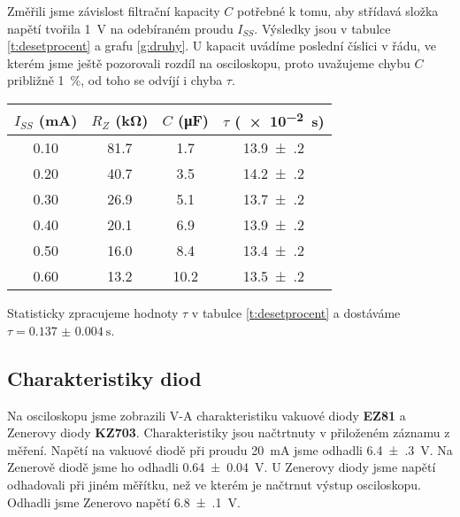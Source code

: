 Změřili jsme závislost filtrační kapacity $C$ potřebné k tomu, aby střídavá složka napětí tvořila \SI{1}{\volt} na odebíraném proudu $I_{SS}$.
Výsledky jsou v tabulce \ref{t:desetprocent} a grafu \ref{g:druhy}.
U kapacit uvádíme poslední číslici v řádu, ve kterém jsme ještě pozorovali rozdíl na osciloskopu, proto uvažujeme chybu $C$ približně \SI{1}{\percent}, od toho se odvíjí i chyba $\tau$.

\begin{graph}[htbp] 
\centering

\caption{Závislost filtrační kapacity $C$ potřebné k tomu, aby střídavá složka napětí tvořila \SI{1}{\volt} špičkové hodnoty, na odebíraném proudu $I_{SS}$}
\label{g:druhy}
\end{graph}

\begin{tabulka}[htbp]
\centering
\begin{tabular}{c|c|c|c}
$I_{SS}$ (\si{\milli\ampere}) & $R_Z$ (\si{\kilo\ohm}) & $C$ (\si{\micro\farad}) & $\tau$ (\SI{e-2}{\second}) \\ \hline

\num{0.10} & \num{81.7} & \num{1.7} & \num{13.9(2)} \\
\num{0.20} & \num{40.7} & \num{3.5} & \num{14.2(2)} \\
\num{0.30} & \num{26.9} & \num{5.1} & \num{13.7(2)} \\
\num{0.40} & \num{20.1} & \num{6.9} & \num{13.9(2)} \\
\num{0.50} & \num{16.0} & \num{8.4} & \num{13.4(2)} \\
\num{0.60} & \num{13.2} & \num{10.2} & \num{13.5(2)} \\
\end{tabular}
\caption{Závislost filtrační kapacity $C$ potřebné k tomu, aby střídavá složka napětí tvořila \SI{1}{\volt} špičkové hodnoty, na odebíraném proudu $I_{SS}$}
\label{t:desetprocent}
\end{tabulka}

Statisticky zpracujeme hodnoty $\tau$ v tabulce \ref{t:desetprocent} a dostáváme $\tau =\SI{0.137(4)}{\second}$.

\subsection*{Charakteristiky diod}

Na osciloskopu jsme zobrazili V-A charakteristiku vakuové diody \textbf{EZ81} a Zenerovy diody \textbf{KZ703}.
Charakteristiky jsou načtrtnuty v přiloženém záznamu z měření.
Napětí na vakuové diodě při proudu \SI{20}{\milli\ampere} jsme odhadli \SI{6.4(3)}{\volt}.
Na Zenerově diodě jsme ho odhadli \SI{0.64(4)}{\volt}.
U Zenerovy diody jsme napětí odhadovali při jiném měřítku, než ve kterém je načtrnut výstup osciloskopu.
Odhadli jsme Zenerovo napětí \SI{6.8(1)}{\volt}.